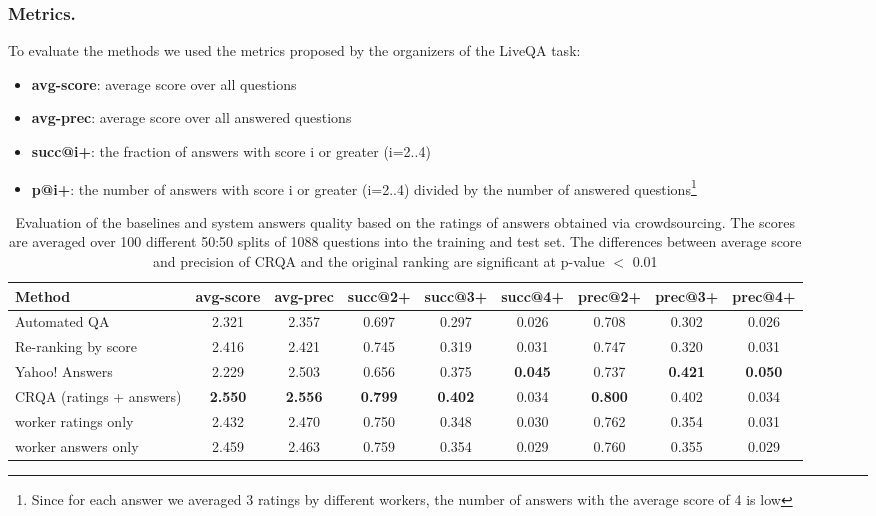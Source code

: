 \subsubsection{Metrics.}
To evaluate the methods we used the metrics proposed by the organizers of the LiveQA task:
\begin{itemize}
\item \textbf{avg-score}: average score over all questions
\item \textbf{avg-prec}: average score over all answered questions
\item \textbf{succ@i+}: the fraction of answers with score i or greater (i=2..4)
\item \textbf{p@i+}: the number of answers with score i or greater (i=2..4) divided by the number of answered questions\footnote{Since for each answer we averaged 3 ratings by different workers, the number of answers with the average score of 4 is low}
\end{itemize}

\begin{table}[ht]
\centering
\begin{tabular}{| p{3.7cm} | c | c | c | c | c | c | c | c |}
\hline
Method & avg-score & avg-prec & succ@2+ & succ@3+ & succ@4+ & prec@2+ & prec@3+ & prec@4+ \\
\hline
Automated QA & 2.321 & 2.357 & 0.697 & 0.297 & 0.026 & 0.708 & 0.302 & 0.026 \\
Re-ranking by score & 2.416 & 2.421 & 0.745 & 0.319 & 0.031 & 0.747 & 0.320 & 0.031 \\
Yahoo! Answers & 2.229 & 2.503 & 0.656 & 0.375 & \textbf{0.045} & 0.737 & \textbf{0.421} & \textbf{0.050} \\
CRQA (ratings + answers) & \textbf{2.550} & \textbf{2.556} & \textbf{0.799} & \textbf{0.402} & 0.034 & \textbf{0.800} & 0.402 & 0.034 \\
\hspace{5mm}worker ratings only & 2.432 & 2.470 & 0.750 & 0.348 & 0.030 & 0.762 & 0.354 & 0.031 \\
\hspace{5mm}worker answers only & 2.459 & 2.463 & 0.759 & 0.354 & 0.029 & 0.760 & 0.355 & 0.029 \\
\hline
\end{tabular}
\caption{Evaluation of the baselines and system answers quality based on the ratings of answers obtained via crowdsourcing. The scores are averaged over 100 different 50:50 splits of 1088 questions into the training and test set. The differences between average score and precision of CRQA and the original ranking are significant at p-value $<$ 0.01}
\label{table:performance}
\end{table}

